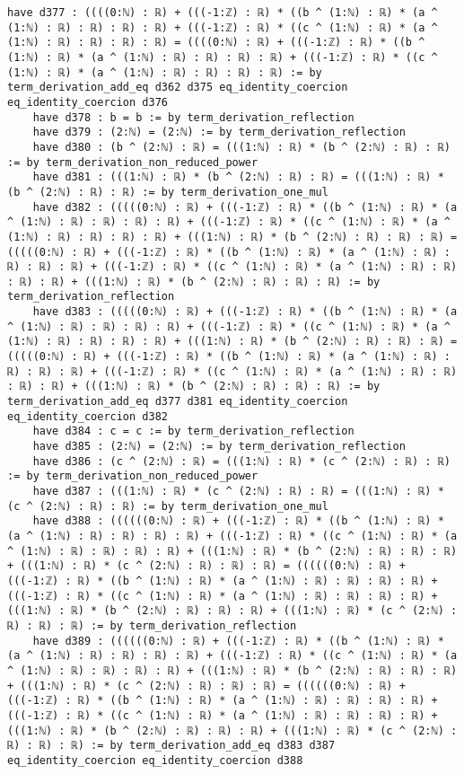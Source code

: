 \documentclass{article}
\begin{document}
\begin{tcolorbox}[colback=white!10, width=\linewidth]
\begin{lstlisting}[language=Lean4]
    have d377 : ((((0:ℕ) : ℝ) + (((-1:ℤ) : ℝ) * ((b ^ (1:ℕ) : ℝ) * (a ^ (1:ℕ) : ℝ) : ℝ) : ℝ) : ℝ) + (((-1:ℤ) : ℝ) * ((c ^ (1:ℕ) : ℝ) * (a ^ (1:ℕ) : ℝ) : ℝ) : ℝ) : ℝ) = ((((0:ℕ) : ℝ) + (((-1:ℤ) : ℝ) * ((b ^ (1:ℕ) : ℝ) * (a ^ (1:ℕ) : ℝ) : ℝ) : ℝ) : ℝ) + (((-1:ℤ) : ℝ) * ((c ^ (1:ℕ) : ℝ) * (a ^ (1:ℕ) : ℝ) : ℝ) : ℝ) : ℝ) := by term_derivation_add_eq d362 d375 eq_identity_coercion eq_identity_coercion d376
    have d378 : b = b := by term_derivation_reflection
    have d379 : (2:ℕ) = (2:ℕ) := by term_derivation_reflection
    have d380 : (b ^ (2:ℕ) : ℝ) = (((1:ℕ) : ℝ) * (b ^ (2:ℕ) : ℝ) : ℝ) := by term_derivation_non_reduced_power
    have d381 : (((1:ℕ) : ℝ) * (b ^ (2:ℕ) : ℝ) : ℝ) = (((1:ℕ) : ℝ) * (b ^ (2:ℕ) : ℝ) : ℝ) := by term_derivation_one_mul
    have d382 : (((((0:ℕ) : ℝ) + (((-1:ℤ) : ℝ) * ((b ^ (1:ℕ) : ℝ) * (a ^ (1:ℕ) : ℝ) : ℝ) : ℝ) : ℝ) + (((-1:ℤ) : ℝ) * ((c ^ (1:ℕ) : ℝ) * (a ^ (1:ℕ) : ℝ) : ℝ) : ℝ) : ℝ) + (((1:ℕ) : ℝ) * (b ^ (2:ℕ) : ℝ) : ℝ) : ℝ) = (((((0:ℕ) : ℝ) + (((-1:ℤ) : ℝ) * ((b ^ (1:ℕ) : ℝ) * (a ^ (1:ℕ) : ℝ) : ℝ) : ℝ) : ℝ) + (((-1:ℤ) : ℝ) * ((c ^ (1:ℕ) : ℝ) * (a ^ (1:ℕ) : ℝ) : ℝ) : ℝ) : ℝ) + (((1:ℕ) : ℝ) * (b ^ (2:ℕ) : ℝ) : ℝ) : ℝ) := by term_derivation_reflection
    have d383 : (((((0:ℕ) : ℝ) + (((-1:ℤ) : ℝ) * ((b ^ (1:ℕ) : ℝ) * (a ^ (1:ℕ) : ℝ) : ℝ) : ℝ) : ℝ) + (((-1:ℤ) : ℝ) * ((c ^ (1:ℕ) : ℝ) * (a ^ (1:ℕ) : ℝ) : ℝ) : ℝ) : ℝ) + (((1:ℕ) : ℝ) * (b ^ (2:ℕ) : ℝ) : ℝ) : ℝ) = (((((0:ℕ) : ℝ) + (((-1:ℤ) : ℝ) * ((b ^ (1:ℕ) : ℝ) * (a ^ (1:ℕ) : ℝ) : ℝ) : ℝ) : ℝ) + (((-1:ℤ) : ℝ) * ((c ^ (1:ℕ) : ℝ) * (a ^ (1:ℕ) : ℝ) : ℝ) : ℝ) : ℝ) + (((1:ℕ) : ℝ) * (b ^ (2:ℕ) : ℝ) : ℝ) : ℝ) := by term_derivation_add_eq d377 d381 eq_identity_coercion eq_identity_coercion d382
    have d384 : c = c := by term_derivation_reflection
    have d385 : (2:ℕ) = (2:ℕ) := by term_derivation_reflection
    have d386 : (c ^ (2:ℕ) : ℝ) = (((1:ℕ) : ℝ) * (c ^ (2:ℕ) : ℝ) : ℝ) := by term_derivation_non_reduced_power
    have d387 : (((1:ℕ) : ℝ) * (c ^ (2:ℕ) : ℝ) : ℝ) = (((1:ℕ) : ℝ) * (c ^ (2:ℕ) : ℝ) : ℝ) := by term_derivation_one_mul
    have d388 : ((((((0:ℕ) : ℝ) + (((-1:ℤ) : ℝ) * ((b ^ (1:ℕ) : ℝ) * (a ^ (1:ℕ) : ℝ) : ℝ) : ℝ) : ℝ) + (((-1:ℤ) : ℝ) * ((c ^ (1:ℕ) : ℝ) * (a ^ (1:ℕ) : ℝ) : ℝ) : ℝ) : ℝ) + (((1:ℕ) : ℝ) * (b ^ (2:ℕ) : ℝ) : ℝ) : ℝ) + (((1:ℕ) : ℝ) * (c ^ (2:ℕ) : ℝ) : ℝ) : ℝ) = ((((((0:ℕ) : ℝ) + (((-1:ℤ) : ℝ) * ((b ^ (1:ℕ) : ℝ) * (a ^ (1:ℕ) : ℝ) : ℝ) : ℝ) : ℝ) + (((-1:ℤ) : ℝ) * ((c ^ (1:ℕ) : ℝ) * (a ^ (1:ℕ) : ℝ) : ℝ) : ℝ) : ℝ) + (((1:ℕ) : ℝ) * (b ^ (2:ℕ) : ℝ) : ℝ) : ℝ) + (((1:ℕ) : ℝ) * (c ^ (2:ℕ) : ℝ) : ℝ) : ℝ) := by term_derivation_reflection
    have d389 : ((((((0:ℕ) : ℝ) + (((-1:ℤ) : ℝ) * ((b ^ (1:ℕ) : ℝ) * (a ^ (1:ℕ) : ℝ) : ℝ) : ℝ) : ℝ) + (((-1:ℤ) : ℝ) * ((c ^ (1:ℕ) : ℝ) * (a ^ (1:ℕ) : ℝ) : ℝ) : ℝ) : ℝ) + (((1:ℕ) : ℝ) * (b ^ (2:ℕ) : ℝ) : ℝ) : ℝ) + (((1:ℕ) : ℝ) * (c ^ (2:ℕ) : ℝ) : ℝ) : ℝ) = ((((((0:ℕ) : ℝ) + (((-1:ℤ) : ℝ) * ((b ^ (1:ℕ) : ℝ) * (a ^ (1:ℕ) : ℝ) : ℝ) : ℝ) : ℝ) + (((-1:ℤ) : ℝ) * ((c ^ (1:ℕ) : ℝ) * (a ^ (1:ℕ) : ℝ) : ℝ) : ℝ) : ℝ) + (((1:ℕ) : ℝ) * (b ^ (2:ℕ) : ℝ) : ℝ) : ℝ) + (((1:ℕ) : ℝ) * (c ^ (2:ℕ) : ℝ) : ℝ) : ℝ) := by term_derivation_add_eq d383 d387 eq_identity_coercion eq_identity_coercion d388

\end{lstlisting}
\end{tcolorbox}
\end{document}
